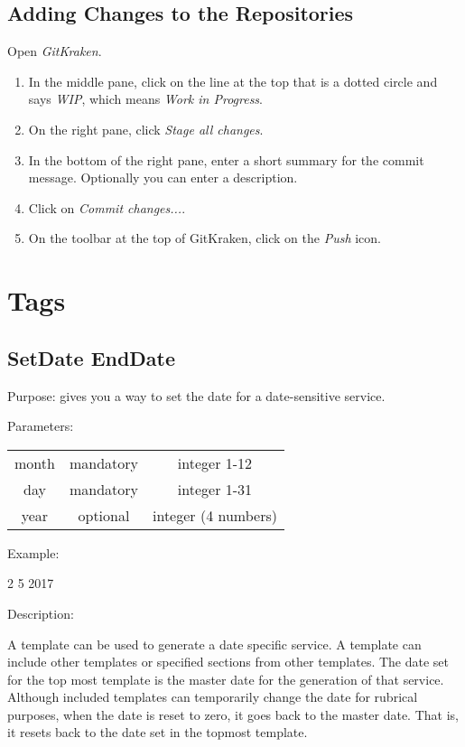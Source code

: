 \documentclass[]{memoir}
\begin{document}
\section{Adding Changes to the Repositories}

Open \emph{GitKraken}.

\begin{enumerate}
    \item In the middle pane, click on the line at the top that is a dotted circle and says \emph{WIP}, which means \emph{Work in Progress}.
    \item On the right pane, click \emph{Stage all changes}.
    \item In the bottom of the right pane, enter a short summary for the commit message.  Optionally you can enter a description.
    \item Click on \emph{Commit changes...}.
    \item On the toolbar at the top of GitKraken, click on the \emph{Push} icon.
\end{enumerate}

\chapter{Tags}

\section{Set\textunderscore Date End\textunderscore Date}

Purpose: gives you a way to set the date for a date-sensitive service.

Parameters:

\begin{tabular}{c|c|c}
    month & mandatory & integer 1-12\\
    day & mandatory & integer 1-31 \\
    year & optional & integer (4 numbers) 
\end{tabular}

Example: 

\begin{atem}
 2
 5
 2017
\end{atem}

Description: 

A template can be used to generate a date specific service.  A template can include other templates or specified sections from other templates.  The date set for the top most template is the master date for the generation of that service.  Although included templates can temporarily change the date for rubrical purposes, when the date is reset to zero, it goes back to the master date.  That is, it resets back to the date set in the topmost template.
\end{document}
